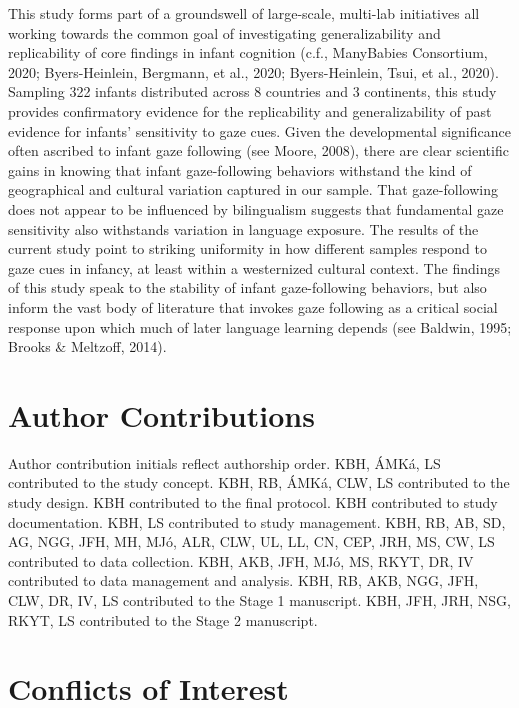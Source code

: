 \documentclass[,man,floatsintext]{apa6}
\begin{document}
This study forms part of a groundswell of large-scale, multi-lab initiatives all working towards the common goal of investigating generalizability and replicability of core findings in infant cognition (c.f., ManyBabies Consortium, 2020; Byers-Heinlein, Bergmann, et al., 2020; Byers-Heinlein, Tsui, et al., 2020). Sampling 322 infants distributed across 8 countries and 3 continents, this study provides confirmatory evidence for the replicability and generalizability of past evidence for infants' sensitivity to gaze cues. Given the developmental significance often ascribed to infant gaze following (see Moore, 2008), there are clear scientific gains in knowing that infant gaze-following behaviors withstand the kind of geographical and cultural variation captured in our sample. That gaze-following does not appear to be influenced by bilingualism suggests that fundamental gaze sensitivity also withstands variation in language exposure. The results of the current study point to striking uniformity in how different samples respond to gaze cues in infancy, at least within a westernized cultural context. The findings of this study speak to the stability of infant gaze-following behaviors, but also inform the vast body of literature that invokes gaze following as a critical social response upon which much of later language learning depends (see Baldwin, 1995; Brooks \& Meltzoff, 2014).

\hypertarget{author-contributions}{%
\section{Author Contributions}\label{author-contributions}}

Author contribution initials reflect authorship order. KBH, ÁMKá, LS contributed to the study concept. KBH, RB, ÁMKá, CLW, LS contributed to the study design. KBH contributed to the final protocol. KBH contributed to study documentation. KBH, LS contributed to study management. KBH, RB, AB, SD, AG, NGG, JFH, MH, MJó, ALR, CLW, UL, LL, CN, CEP, JRH, MS, CW, LS contributed to data collection. KBH, AKB, JFH, MJó, MS, RKYT, DR, IV contributed to data management and analysis. KBH, RB, AKB, NGG, JFH, CLW, DR, IV, LS contributed to the Stage 1 manuscript. KBH, JFH, JRH, NSG, RKYT, LS contributed to the Stage 2 manuscript.

\hypertarget{conflicts-of-interest}{%
\section{Conflicts of Interest}\label{conflicts-of-interest}}
\end{document}
